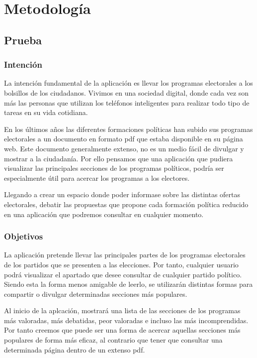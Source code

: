 \newpage
\thispagestyle{sectioned}
\chapter{Metodología}

\section{Prueba}

\subsection{Intención}

La intención fundamental de la aplicación es llevar los programas electorales a los bolsillos de los ciudadanos. Vivimos en una sociedad digital, donde cada vez son más las personas que utilizan los teléfonos inteligentes para realizar todo tipo de tareas en su vida cotidiana.

En los últimos años las diferentes formaciones políticas han subido sus programas electorales a un documento en formato pdf que estaba disponible en su página web. Este documento generalmente extenso, no es un medio fácil de divulgar y mostrar a la ciudadanía. Por ello pensamos que una aplicación que pudiera visualizar las principales secciones de los programas políticos, podría ser especialmente útil para acercar los programas a los electores.

Llegando a crear un espacio donde poder informase sobre las distintas ofertas electorales, debatir las propuestas que propone cada formación política reducido en una aplicación que podremos consultar en cualquier momento.

\subsection{Objetivos}

La aplicación pretende llevar las principales partes de los programas electorales de los partidos que se presenten a las elecciones. Por tanto, cualquier usuario podrá visualizar el apartado que desee consultar de cualquier partido político. Siendo esta la forma menos amigable de leerlo, se utilizarán distintas formas para compartir o divulgar determinadas secciones más populares.

Al inicio de la aplcación, mostrará una lista de las secciones de los programas más valoradas, más debatidas, peor valoradas e incluso las más incomprendidas. Por tanto creemos que puede ser una forma de acercar aquellas secciones más populares de forma más eficaz, al contrario que tener que consultar una determinada página dentro de un extenso pdf.

